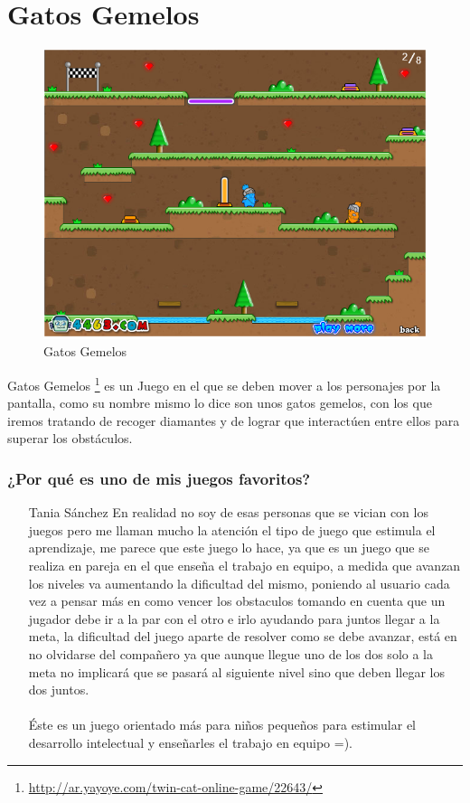 \section{Gatos Gemelos}

\begin{figure}[htbp]
\begin{center}
\includegraphics[width=.60\textwidth]{./imagenes/gatos.png}
\caption{Gatos Gemelos}
\label{Gatos Gemelos}
\end{center}
\end{figure}
Gatos Gemelos \footnote{\url{http://ar.yayoye.com/twin-cat-online-game/22643/}} es un Juego en el que se deben mover a los personajes por la pantalla, como su nombre mismo lo dice son unos gatos gemelos, con los que iremos tratando de recoger diamantes y de lograr que interactúen entre ellos para superar los obstáculos.

\subsubsection{¿Por qué es uno de mis juegos favoritos?}
\begin{itemize}
\item[Tania Sánchez] En realidad no soy de esas personas que se vician con los juegos pero me llaman mucho la atención el tipo de juego que estimula el aprendizaje, me parece que este juego lo hace, ya que es un juego que se realiza en pareja en el que enseña el trabajo en equipo, a medida que avanzan los niveles va aumentando la dificultad del mismo, poniendo al usuario cada vez a pensar más en como vencer los obstaculos tomando en cuenta que un jugador debe ir a la par con el otro e irlo ayudando para juntos llegar a la meta, la dificultad del juego aparte de resolver como se debe avanzar, está en no olvidarse del compañero ya que aunque llegue uno de los dos solo a la meta no implicará que se pasará al siguiente nivel sino que deben llegar los dos juntos. 
\\
\\
Éste es un juego orientado más para niños pequeños para estimular el desarrollo intelectual y enseñarles el trabajo en equipo =).
\end{itemize}